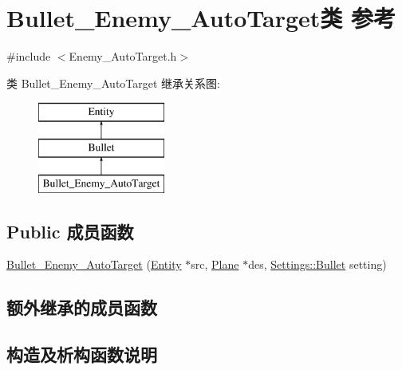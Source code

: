 \hypertarget{class_bullet___enemy___auto_target}{}\section{Bullet\+\_\+\+Enemy\+\_\+\+Auto\+Target类 参考}
\label{class_bullet___enemy___auto_target}


{\ttfamily \#include $<$Enemy\+\_\+\+Auto\+Target.\+h$>$}

类 Bullet\+\_\+\+Enemy\+\_\+\+Auto\+Target 继承关系图\+:\begin{figure}[H]
\begin{center}
\leavevmode
\includegraphics[height=3.000000cm]{class_bullet___enemy___auto_target}
\end{center}
\end{figure}
\subsection*{Public 成员函数}
\begin{DoxyCompactItemize}
\item 
\hyperlink{class_bullet___enemy___auto_target_ad2d9d9d8016dff0e1fd6f11c8800f314}{Bullet\+\_\+\+Enemy\+\_\+\+Auto\+Target} (\hyperlink{class_entity}{Entity} $\ast$src, \hyperlink{class_plane}{Plane} $\ast$des, \hyperlink{struct_settings_1_1_bullet}{Settings\+::\+Bullet} setting)
\end{DoxyCompactItemize}
\subsection*{额外继承的成员函数}


\subsection{构造及析构函数说明}
\mbox{\label{class_bullet___enemy___auto_target_ad2d9d9d8016dff0e1fd6f11c8800f314}} 
